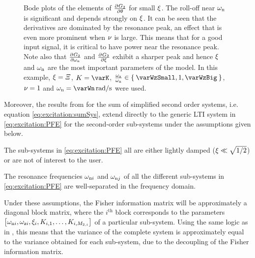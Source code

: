 \begin{figure}
  \centering
  \setlength{}
  \setlength\figureheight{\figurewidth}
  
  \caption[Derivatives of a second-order sub-system towards each of its parameters.]{Bode plots of the elements of $\PartialDerivative{G_2}{\theta}$ for small $\damping$. 
  The roll-off near $\wn$ is significant and depends strongly on $\damping$.
  It can be seen that the derivatives are dominated by the resonance peak, an effect that is even more prominent when $\multiplicity$ is large.
  This means that for a good input signal, it is critical to have power near the resonance peak. 
  Note also that $\PartialDerivative{G_2}{\wn}$ and $\PartialDerivative{G_2}{\damping}$ exhibit a sharper peak and hence $\damping$ and $\wn$ are the most important parameters of the model.
  In this example, $\damping = \varXi$, $K = \varK$, $\frac{\wz}{\wn} \in \Set{\varWzSmall, 1, \varWzBig}$, $\multiplicity=1$ and $\wn = \varWn \unit{rad/s}$ were used.
}
\label{fig:excitation:derivatives}
\end{figure}

Moreover, the results from  for the sum of simplified second order systems, i.e. equation \eqref{eq:excitation:sumSys}, extend directly to the generic \gls{LTI} system in \eqref{eq:excitation:PFE} for the second-order sub-systems under the assumptions given below.

\begin{assumption}
The sub-systems in \eqref{eq:excitation:PFE} all are either lightly damped ($\damping \ll \sqrt{1/2}$) or are not of interest to the user.
\end{assumption}

\begin{assumption}
The resonance frequencies $\wn[i]$ and $\wn[j]$ of all the different sub-systems in \eqref{eq:excitation:PFE} are well-separated in the frequency domain.
\end{assumption}

Under these assumptions, the Fisher information matrix will be approximately a diagonal block matrix, where the $i^{\text{th}}$ block corresponds to the parameters $\left[\wn[i], \wz[i], \damping[i], \dc[i,1], \ldots, \dc[i,M_{2,i}] \right]$ of a particular sub-system.
Using the same logic as in , this means that the variance of the complete system is approximately equal to the variance obtained for each sub-system, due to the decoupling of the Fisher information matrix.


